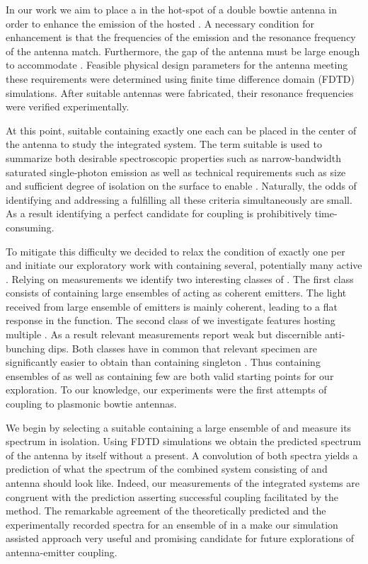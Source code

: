    In our work we aim to place a \nd in the hot-spot of a double bowtie antenna in order to enhance the emission of the hosted \sivs. A necessary condition for enhancement is that the frequencies of the \siv emission and the resonance frequency of the antenna match. Furthermore, the gap of the antenna must be large enough to accommodate \nds. Feasible physical design parameters for the antenna meeting these requirements were determined using finite time difference domain (FDTD) simulations. After suitable antennas were fabricated, their resonance frequencies were verified experimentally.

   At this point, suitable \nds containing exactly one \siv each can be placed in the center of the antenna to study the integrated system. The term suitable is used to summarize both desirable spectroscopic properties such as narrow-bandwidth saturated single-photon emission as well as technical requirements such as \nd size and sufficient degree of isolation on the surface to enable \pp. Naturally, the odds of identifying and addressing a \nd fulfilling all these criteria simultaneously are small. As a result identifying a perfect candidate for coupling is prohibitively time-consuming.

	 To mitigate this difficulty we decided to relax the condition of exactly one \siv per \nd and initiate our exploratory work with \nds containing several, potentially many active \sivs. Relying on \gtz measurements we identify two interesting classes of \nds. The first class consists of \nds containing large ensembles of \sivs acting as coherent emitters. The \fl light received from large ensemble of emitters is mainly coherent, leading to a flat response in the \gtz function. The second class of \nds we investigate features \nds hosting multiple \sivs. As a result relevant \gtz measurements report weak but discernible anti-bunching dips. Both classes have in common that relevant \nd specimen are significantly easier to obtain than \nds containing singleton \sivs. Thus \nds containing ensembles of \sivs as well as \nds containing few \sivs are both valid starting points for our exploration. To our knowledge, our experiments were the first attempts of coupling \sivs to plasmonic bowtie antennas.


   We begin by selecting a suitable \nd containing a large ensemble of \sivs and measure its spectrum in isolation. Using FDTD simulations we obtain the predicted spectrum of the antenna by itself without a \nd present. A convolution of both spectra yields a prediction of what the spectrum of the combined system consisting of \nd and antenna should look like. Indeed, our measurements of the integrated systems are congruent with the prediction asserting successful coupling facilitated by the \pp method. The remarkable agreement of the theoretically predicted and the experimentally recorded spectra for an ensemble of \sivs in a \nd make our simulation assisted approach very useful and promising candidate for future explorations of antenna-emitter coupling.

